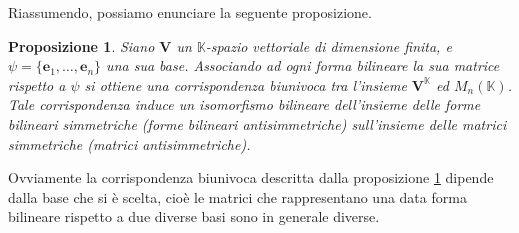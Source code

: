 \documentclass{article}
\theoremstyle{plain}
\newtheorem{prop}[thm]{Proposizione}
\theoremstyle{definition}
\theoremstyle{remark}
\begin{document}
Riassumendo, possiamo enunciare la seguente proposizione.

\vspace{10pt}

\begin{bxthm}
\begin{prop}\label{quindiciquattroo}
Siano $\mathbf{V}$ un $\mathbb{K}$-spazio vettoriale di dimensione finita, e $\psi = \{\mathbf{e}_1, \ldots, \mathbf{e}_n\}$ 
una sua base. Associando ad ogni forma bilineare la sua matrice rispetto a $\psi$ si ottiene una corrispondenza 
biunivoca tra l'insieme $\mathbf{V}^{\mathbb{K}}$ ed $M_n(\mathbb{K})$. 
Tale corrispondenza induce un isomorfismo bilineare dell'insieme delle forme bilineari simmetriche (forme bilineari 
antisimmetriche) sull'insieme delle matrici simmetriche (matrici antisimmetriche).    
\end{prop}
\end{bxthm}

\vspace{10pt}

Ovviamente la corrispondenza biunivoca descritta dalla proposizione \ref{quindiciquattroo} dipende dalla base 
che si è scelta, cioè le matrici che rappresentano una data forma bilineare rispetto a due diverse basi sono 
in generale diverse.

\vspace{10pt}
\end{document}
